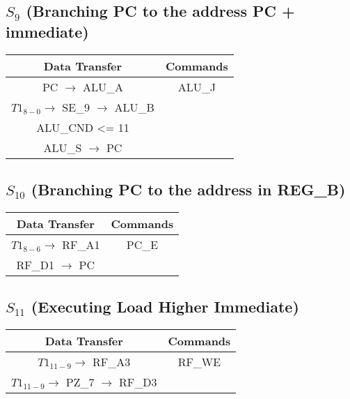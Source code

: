 \documentclass[]{article}
\begin{document}
        \subsection*{$S_9$ (Branching PC to the address PC + immediate)} %
        \begin{center}
            \begin{tabular}{|c|c|}
                \hline
                Data Transfer & Commands \\
                \hline
                PC $\to$ ALU\_A & ALU\_J\\
                $T1_{8-0} \to$ SE\_9 $\to$ ALU\_B & \\
                ALU\_CND <= 11 & \\
                ALU\_S $\to$ PC & \\
                \hline
            \end{tabular}
        \end{center}
        \subsection*{$S_{10}$ (Branching PC to the address in REG\_B)} %
        \begin{center}
            \begin{tabular}{|c|c|}
                \hline
                Data Transfer & Commands \\
                \hline
                $T1_{8-6} \to$ RF\_A1 & PC\_E\\
                RF\_D1 $\to$ PC & \\
                \hline
            \end{tabular}
        \end{center}
        \subsection*{$S_{11}$ (Executing Load Higher Immediate)} %
        \begin{center}
            \begin{tabular}{|c|c|}
                \hline
                Data Transfer & Commands \\
                \hline
                $T1_{11-9} \to$ RF\_A3 & RF\_WE\\
                $T1_{11-9} \to$ PZ\_7 $\to$ RF\_D3 & \\   %
                \hline
            \end{tabular}
        \end{center}
\end{document}
